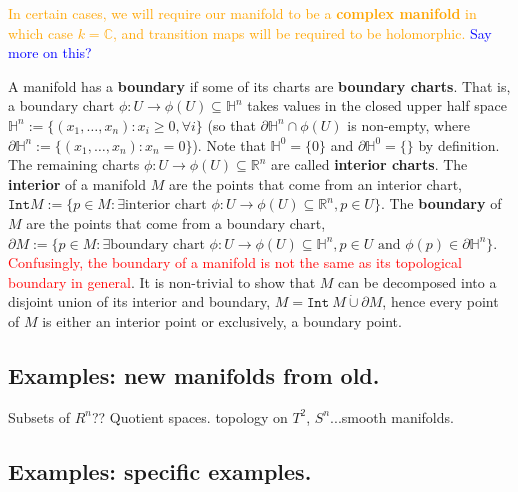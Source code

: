 \documentclass[a4paper]{article}
\theoremstyle{definition} \newtheorem*{definition}{Definition}
\theoremstyle{definition} \newtheorem*{definitions}{Definitions}
\theoremstyle{plain} \newtheorem{theorem}{Theorem}[section]
\theoremstyle{plain} \newtheorem{proposition}[theorem]{Proposition}
\theoremstyle{plain} \newtheorem{corollary}[theorem]{Corollary}
\theoremstyle{plain} \newtheorem{lemma}[theorem]{Lemma}
\theoremstyle{plain} \newtheorem{example}[theorem]{Example}
\newcommand{\checkCorrect}[1]{\textcolor{red}{#1}}
\newcommand{\understandBetter}[1]{\textcolor{orange}{#1}}
\newcommand{\explainFurther}[1]{\textcolor{blue}{#1}}
\newcommand{\defn}[1]{\textbf{#1}}
\newcommand{\realnos}{\mathbb{R}}
\newcommand{\complexnos}{\mathbb{C}}
\begin{document}
\understandBetter{In certain cases, we will require our manifold to be a \defn{complex manifold} in which case $k=\complexnos$, and transition maps will be required to be \understandBetter{holomorphic}.}
\explainFurther{Say more on this?}

A manifold has a \defn{boundary} if some of its charts are \defn{boundary charts}. That is, a boundary chart $\phi:U\to \phi(U)\subseteq \mathbb{H}^n$ takes values in the closed upper half space $\mathbb{H}^n := \{(x_1, \ldots, x_n): x_i\geq 0, \forall i\}$ (so that $\partial \mathbb{H}^n \cap \phi(U)$ is non-empty, where $\partial \mathbb{H}^n := \{(x_1, \ldots, x_n): x_n=0\}$). Note that $\mathbb{H}^0 = \{0\}$ and $\partial \mathbb{H}^0 = \{\}$ by definition. The remaining charts $\phi:U\to \phi(U)\subseteq \realnos^n$ are called \defn{interior charts}. The \defn{interior} of a manifold $M$ are the points that come from an interior chart, $\texttt{Int} M := \{p\in M: \exists \textrm{interior chart } \phi:U\to \phi(U)\subseteq \realnos^n, p\in U \}$. The \defn{boundary} of $M$ are the points that come from a boundary chart, $\partial M:=\{p\in M: \exists \textrm{boundary chart } \phi:U\to \phi(U)\subseteq \mathbb{H}^n, p\in U \textrm{ and } \phi(p)\in \partial \mathbb{H}^n \}$. \checkCorrect{Confusingly, the boundary of a manifold is not the same as its topological boundary in general}. It is non-trivial to show that $M$ can be decomposed into a disjoint union of its interior and boundary, $M = \mathtt{Int} \ M \mathbin{\dot{\cup}} \partial M$, hence every point of $M$ is either an interior point or exclusively, a boundary point.

\subsection{Examples: new manifolds from old.}

Subsets of $R^n$?? Quotient spaces.
topology on $T^2$, $S^n$...smooth manifolds.

\subsection{Examples: specific examples.}
\end{document}
